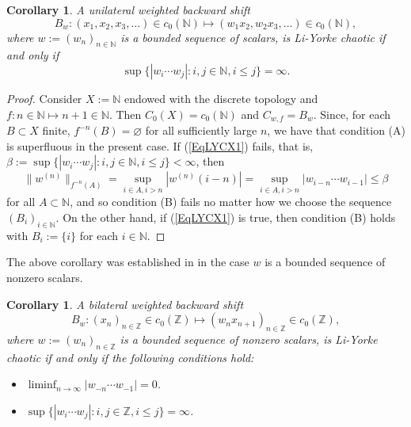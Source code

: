 \documentclass[12pt]{amsart}
\theoremstyle{theorem}
\newtheorem{corollary}[theorem]{Corollary}
\theoremstyle{definition}
\theoremstyle{remark} \theoremstyle{question} \theoremstyle{example}
\newcommand{\N}{\mathbb{N}}
\newcommand{\Z}{\mathbb{Z}}
\begin{document}
\begin{corollary}\label{CorLYCX1}
A unilateral weighted backward shift
\[
B_w : (x_1,x_2,x_3,\ldots) \in c_0(\N) \mapsto (w_1x_2,w_2x_3,\ldots) \in c_0(\N),
\]
where $w\!:= (w_n)_{n \in \N}$ is a bounded sequence of scalars, is Li-Yorke chaotic if and only if
\begin{equation}\label{EqLYCX1}
\sup\{|w_i \cdots w_j| : i,j \in \N, i \leq j\} = \infty.
\end{equation}
\end{corollary}

\begin{proof}
Consider $X\!:= \N$ endowed with the discrete topology and $f : n \in \N \mapsto n+1 \in \N$.
Then $C_0(X) = c_0(\N)$ and $C_{w,f} = B_w$. 
Since, for each $B \subset X$ finite, $f^{-n}(B) = \varnothing$ for all sufficiently large $n$, we have that condition (A) is superfluous in the present case. If (\ref{EqLYCX1}) fails, that is, $\beta\!:= \sup\{|w_i \cdots w_j| : i,j \in \N, i \leq j\} < \infty$, then
\[
\|w^{(n)}\|_{f^{-n}(A)} = \sup_{i \in A, i > n} |w^{(n)}(i-n)| = \sup_{i \in A, i > n} |w_{i-n} \cdots w_{i-1}| \leq \beta
\]
for all $A \subset \N$, and so condition (B) fails no matter how we choose the sequence $(B_i)_{i \in \N}$.
On the other hand, if (\ref{EqLYCX1}) is true, then condition (B) holds with $B_i\!:= \{i\}$ for each $i \in \N$.
\end{proof}

The above corollary was established in \cite[Proposition~27]{BerBonMarPer11} in the case $w$ is a bounded sequence of nonzero scalars.

\begin{corollary}\label{CorLYCX2}
A bilateral weighted backward shift
\[
B_w : (x_n)_{n \in \Z} \in c_0(\Z) \mapsto (w_n x_{n+1})_{n \in \Z} \in c_0(\Z),
\]
where $w\!:= (w_n)_{n \in \Z}$ is a bounded sequence of nonzero scalars, is Li-Yorke chaotic if and only if the following conditions hold:
\begin{itemize}
\item [\rm (a)] $\displaystyle \liminf_{n \to \infty} |w_{-n} \cdots w_{-1}| = 0$.
\item [\rm (b)] $\sup\{|w_i \cdots w_j| : i,j \in \Z, i \leq j\} = \infty$.
\end{itemize}
\end{corollary}
\end{document}
